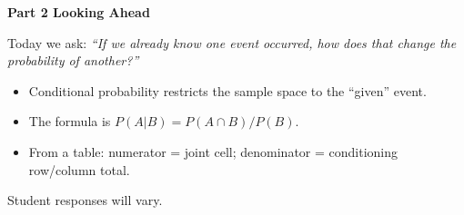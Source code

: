 \documentclass[10pt]{article}
\begin{document}
\vspace{0.3in}

{\large\bfseries\color{navy} Part 2 \quad Looking Ahead}

\vspace{0.12in}

\noindent Today we ask: \textit{``If we already know one event occurred, how does that
change the probability of another?''}

\vspace{0.14in}

\begin{tcolorbox}[colback=greenbg, colframe=greenacc, boxrule=0.8pt, arc=2mm,
    left=4mm, right=4mm, top=3mm, bottom=3mm]
    \small
    \begin{itemize}[leftmargin=1.3em, itemsep=8pt]
      \item Conditional probability restricts the sample space to the ``given'' event.
      \item The formula is $P(A|B) = P(A \cap B) / P(B)$.
      \item From a table: numerator = joint cell; denominator = conditioning row/column total.
    \end{itemize}
\end{tcolorbox}

\vspace{0.2in}

\noindent\textcolor{slate}{\small Student responses will vary.}
\end{document}
